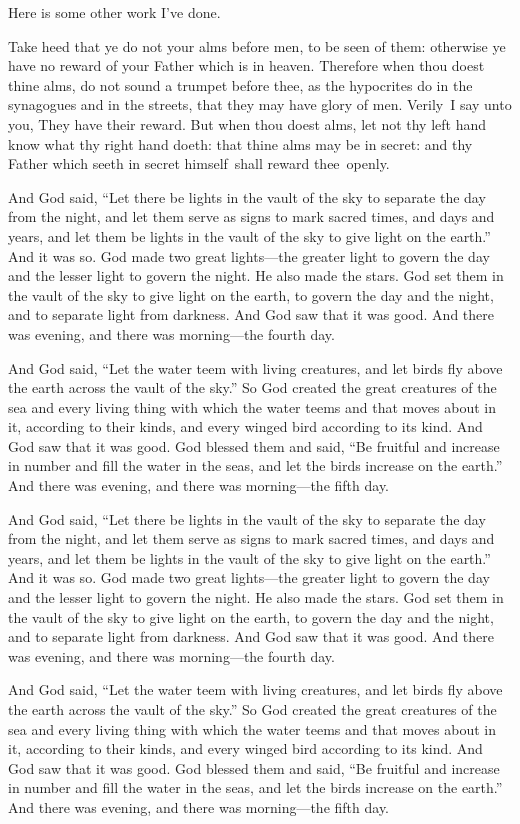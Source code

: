 \documentclass{grattanAlpha}
\begin{document}
Here is some other work I've done.

Take heed that ye do not your alms before men, to be seen of them: otherwise ye have no reward of your Father which is in heaven. Therefore when thou doest thine alms, do not sound a trumpet before thee, as the hypocrites do in the synagogues and in the streets, that they may have glory of men. Verily~I say unto you, They have their reward.  But when thou doest alms, let not thy left hand know what thy right hand doeth: that thine alms may be in secret: and thy Father which seeth in secret himself~shall reward thee~openly.

And God said, “Let there be lights in the vault of the sky to separate the day from the night, and let them serve as signs to mark sacred times, and days and years, and let them be lights in the vault of the sky to give light on the earth.” And it was so. God made two great lights—the greater light to govern the day and the lesser light to govern the night. He also made the stars. God set them in the vault of the sky to give light on the earth, to govern the day and the night, and to separate light from darkness. And God saw that it was good. And there was evening, and there was morning—the fourth day.

And God said, “Let the water teem with living creatures, and let birds fly above the earth across the vault of the sky.” So God created the great creatures of the sea and every living thing with which the water teems and that moves about in it, according to their kinds, and every winged bird according to its kind. And God saw that it was good. God blessed them and said, “Be fruitful and increase in number and fill the water in the seas, and let the birds increase on the earth.” And there was evening, and there was morning—the fifth day.

And God said, “Let there be lights in the vault of the sky to separate the day from the night, and let them serve as signs to mark sacred times, and days and years, and let them be lights in the vault of the sky to give light on the earth.” And it was so. God made two great lights—the greater light to govern the day and the lesser light to govern the night. He also made the stars. God set them in the vault of the sky to give light on the earth, to govern the day and the night, and to separate light from darkness. And God saw that it was good. And there was evening, and there was morning—the fourth day.

And God said, “Let the water teem with living creatures, and let birds fly above the earth across the vault of the sky.” So God created the great creatures of the sea and every living thing with which the water teems and that moves about in it, according to their kinds, and every winged bird according to its kind. And God saw that it was good. God blessed them and said, “Be fruitful and increase in number and fill the water in the seas, and let the birds increase on the earth.” And there was evening, and there was morning—the fifth day.
\end{document}
